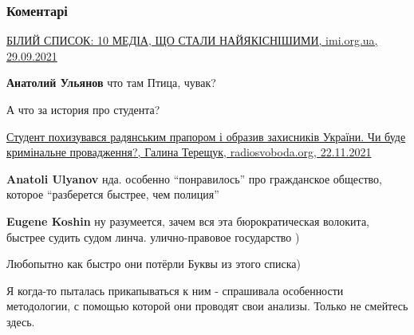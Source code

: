  
 
 
 
 
\subsubsection{Коментарі}

\begin{itemize} %

\href{https://imi.org.ua/monitorings/bilyj-spysok-10-media-shho-staly-najyakisnishymy-i41541}{%
БІЛИЙ СПИСОК: 10 МЕДІА, ЩО СТАЛИ НАЙЯКІСНІШИМИ, imi.org.ua, 29.09.2021%
}


\begin{itemize} %
\textbf{Анатолий Ульянов} что там Птица, чувак?
\end{itemize} %

А что за история про студента?

\begin{itemize} %

\href{https://www.radiosvoboda.org/a/komunizm-totalitarnyy-rezhym-symvoilka/31573870.html}{%
Студент похизувався радянським прапором і образив захисників України. Чи буде кримінальне провадження?, %
Галина Терещук, radiosvoboda.org, 22.11.2021%
}

\textbf{Anatoli Ulyanov} нда. особенно \enquote{понравилось} про гражданское общество, которое \enquote{разберется быстрее, чем полиция}

\textbf{Eugene Koshin} ну разумеется, зачем вся эта бюрократическая волокита, быстрее судить судом линча. улично-правовое государство )

\end{itemize} %

Любопытно как быстро они потёрли Буквы из этого списка)


Я когда-то пыталась прикапываться к ним - спрашивала особенности методологии, с
помощью которой они проводят свои анализы. Только не смейтесь здесь.



\end{itemize}
